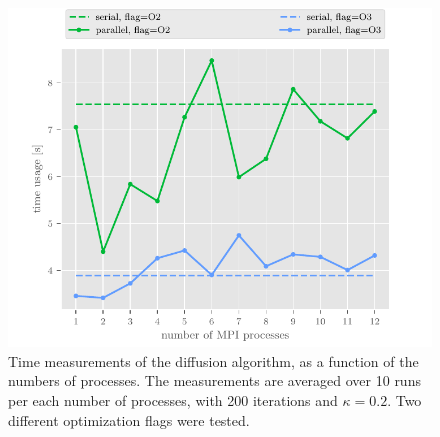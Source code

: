 \documentclass[10pt, a4paper]{amsart}
\numberwithin{figure}{section}
\numberwithin{table}{section}
\begin{document}
\begin{figure}
    \includegraphics[scale=0.9]{../runtime.pdf}
    \caption{Time measurements of the diffusion algorithm, as a function of the numbers of processes. The measurements are averaged over 10 runs per each number of processes, with 200 iterations and $\kappa=0.2$. Two different optimization flags were tested.}
    \label{fig:runtime}
\end{figure}


%
%





\end{document}
